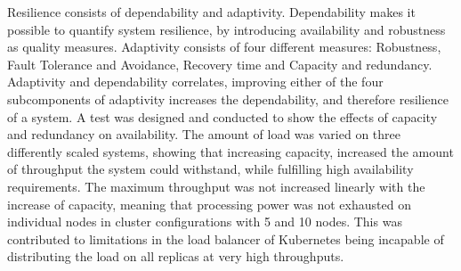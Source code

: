 Resilience consists of dependability and adaptivity. Dependability makes it possible to quantify system resilience, by introducing availability and robustness as quality measures. Adaptivity consists of four different measures: Robustness, Fault Tolerance and Avoidance, Recovery time and Capacity and redundancy. Adaptivity and dependability correlates, improving either of the four subcomponents of adaptivity increases the dependability, and therefore resilience of a system. A test was designed and conducted to show the effects of capacity and redundancy on availability. The amount of load was varied on three differently scaled systems, showing that increasing capacity, increased the amount of throughput the system could withstand, while fulfilling high availability requirements. The maximum throughput was not increased linearly with the increase of capacity, meaning that processing power was not exhausted on individual nodes in cluster configurations with 5 and 10 nodes. This was contributed to limitations in the load balancer of Kubernetes being incapable of distributing the load on all replicas at very high throughputs. 